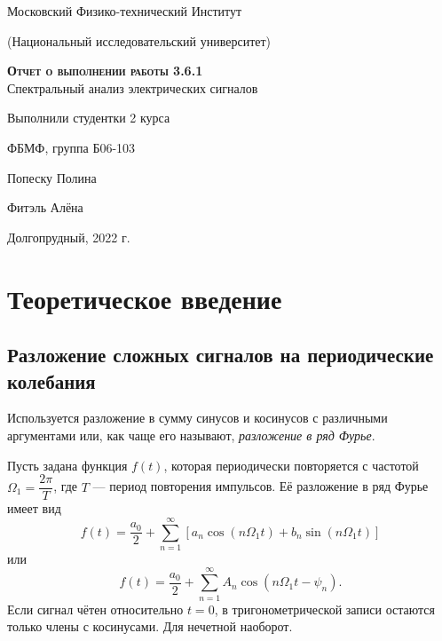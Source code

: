 \documentclass[12pt,a4paper]{article}
\begin{document}
\begin{titlepage}
  \begin{center}
    \huge
    Московский Физико-технический Институт
    
    (Национальный исследовательский университет)
    \vspace{0.5cm}

   
    \vspace{0.25cm}
 
    \vfill
 
    \vfill

    \textsc{\bf{Отчет о выполнении работы 3.6.1}}\\[3mm]
    
    {\LARGE Спектральный анализ электрических сигналов}
  \bigskip
    \vfill
    
\end{center}
\vfill
\begin{flushright}

    Выполнили студентки 2 курса
    
    ФБМФ, группа Б06-103

    Попеску Полина
    
    
    Фитэль Алёна

\end{flushright}
\bigskip


\vfill

\begin{center}
  Долгопрудный, 2022 г.
\end{center}
\end{titlepage}

\section{Теоретическое введение}

\subsection{Разложение сложных сигналов на периодические колебания}
Используется разложение в сумму синусов и косинусов с различными аргументами или, как чаще его называют, \textit{разложение в ряд Фурье}.

Пусть задана функция $f(t)$, которая периодически повторяется с частотой $\Omega_1 = \dfrac{2\pi}{T}$, где $T$ --- период повторения импульсов. Её разложение в ряд Фурье имеет вид 
\begin{equation}
f(t) = \dfrac{a_0}{2} + \sum\limits_{n = 1}^{\infty}\left[a_n \cos \left(n \Omega_1t\right) + b_n \sin \left(n \Omega_1t\right)\right]
\end{equation}
или
\begin{equation}
f(t) = \dfrac{a_0}{2} + \sum\limits_{n = 1}^{\infty}A_n \cos \left(n\Omega_1t-\psi_n\right).
\end{equation}
Если сигнал чётен относительно $t=0$, в тригонометрической записи остаются только члены с косинусами. Для нечетной наоборот.
\end{document}
